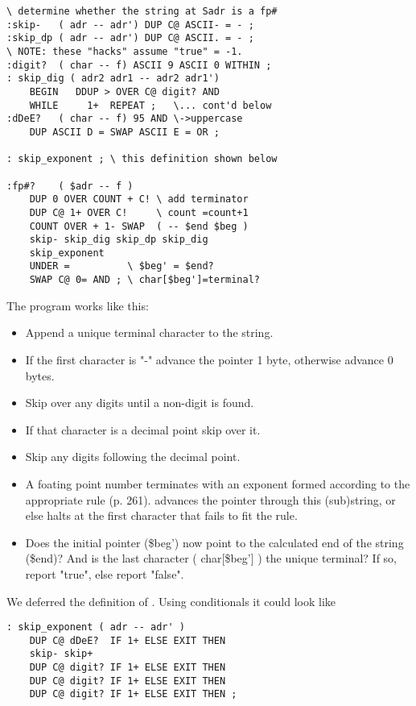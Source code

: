 \begin{lstlisting}
\ determine whether the string at Sadr is a fp#
:skip-   ( adr -- adr') DUP C@ ASCII- = - ;
:skip_dp ( adr -- adr') DUP C@ ASCII. = - ;
\ NOTE: these "hacks" assume "true" = -1.
:digit?  ( char -- f) ASCII 9 ASCII 0 WITHIN ;
: skip_dig ( adr2 adr1 -- adr2 adr1')
    BEGIN   DDUP > OVER C@ digit? AND
    WHILE     1+  REPEAT ;   \... cont'd below
:dDeE?   ( char -- f) 95 AND \->uppercase
    DUP ASCII D = SWAP ASCII E = OR ;

: skip_exponent ; \ this definition shown below

:fp#?    ( $adr -- f )
    DUP 0 OVER COUNT + C! \ add terminator
    DUP C@ 1+ OVER C!     \ count =count+1
    COUNT OVER + 1- SWAP  ( -- $end $beg )
    skip- skip_dig skip_dp skip_dig
    skip_exponent
    UNDER =          \ $beg' = $end?
    SWAP C@ 0= AND ; \ char[$beg']=terminal?
\end{lstlisting}

The program works like this:

\begin{itemize}
    \item Append a unique terminal character to the string.
    \item If the first character is "-" advance the pointer 1 byte, otherwise advance 0 bytes.
    \item Skip over any digits until a non-digit is found.
    \item If that character is a decimal point skip over it.
    \item Skip any digits following the decimal point.
    \item A foating point number terminates with an exponent formed according to the appropriate rule (p. 261).  advances the pointer through this (sub)string, or else halts at the first character that fails to fit the rule.
    \item Does the initial pointer (\$beg') now point to the calculated end of the string (\$end)? And is the last character ( char[\$beg'] ) the unique terminal? If so, report "true", else report "false".
\end{itemize}

We deferred the definition of . Using conditionals it could look like

\begin{lstlisting}
: skip_exponent ( adr -- adr' )
    DUP C@ dDeE?  IF 1+ ELSE EXIT THEN
    skip- skip+
    DUP C@ digit? IF 1+ ELSE EXIT THEN
    DUP C@ digit? IF 1+ ELSE EXIT THEN
    DUP C@ digit? IF 1+ ELSE EXIT THEN ;
\end{lstlisting}


